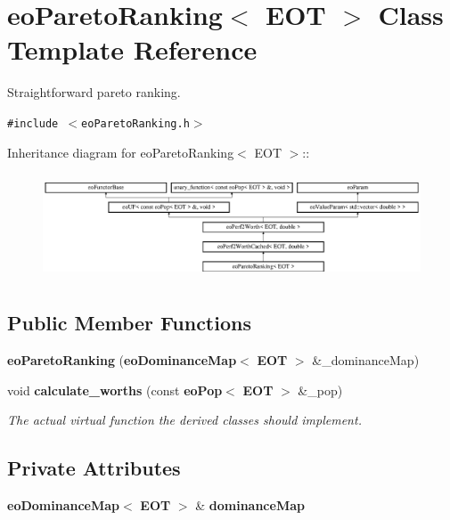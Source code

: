 \section{eo\-Pareto\-Ranking$<$ EOT $>$ Class Template Reference}
\label{classeo_pareto_ranking}
Straightforward pareto ranking.  


{\tt \#include $<$eo\-Pareto\-Ranking.h$>$}

Inheritance diagram for eo\-Pareto\-Ranking$<$ EOT $>$::\begin{figure}[H]
\begin{center}
\leavevmode
\includegraphics[height=3.15315cm]{classeo_pareto_ranking}
\end{center}
\end{figure}
\subsection*{Public Member Functions}
\begin{CompactItemize}
\item 
{\bf eo\-Pareto\-Ranking} ({\bf eo\-Dominance\-Map}$<$ {\bf EOT} $>$ \&\_\-dominance\-Map)\label{classeo_pareto_ranking_a0}

\item 
void {\bf calculate\_\-worths} (const {\bf eo\-Pop}$<$ {\bf EOT} $>$ \&\_\-pop)\label{classeo_pareto_ranking_a1}

\begin{CompactList}\small\item\em The actual virtual function the derived classes should implement. \item\end{CompactList}\end{CompactItemize}
\subsection*{Private Attributes}
\begin{CompactItemize}
\item 
{\bf eo\-Dominance\-Map}$<$ {\bf EOT} $>$ \& {\bf dominance\-Map}\label{classeo_pareto_ranking_r0}

\end{CompactItemize}



